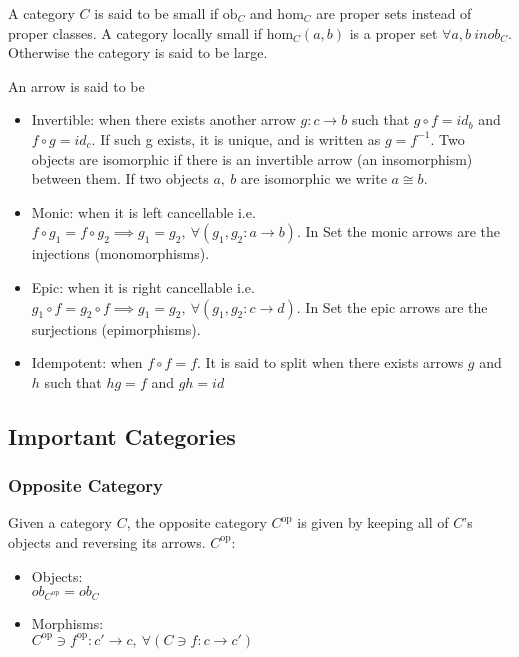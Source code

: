 \noindent A category $C$ is said to be small if $\mathrm{ob}_C$ and
$\mathrm{hom}_C$ are proper sets instead of proper classes. A category locally
small if $\mathrm{hom}_C(a, b)$ is a proper set $\forall a, b\ in ob_C$.
Otherwise the category is said to be large. \cite{nlab:category}
\medskip

\noindent\cite{categories_working_mathematician} An arrow is said to be
\begin{itemize}
  \item Invertible: when there exists another arrow $g:c \to b$ such that
    $g\circ f = id_b$ and $f\circ g = id_c$. If such g exists, it is unique, and
    is written as $g= f^{-1}$. Two objects are isomorphic if there is an
    invertible arrow (an insomorphism) between them. If two objects $a,\ b$
    are isomorphic we write $a\cong b$.
  \item Monic: when it is left cancellable i.e.
    $f \circ g_1 = f \circ g_2 \implies g_1 = g_2,\ \forall (g_1, g_2:a\to b)$.
    In Set the monic arrows are the injections (monomorphisms).
  \item Epic: when it is right cancellable i.e.
    $g_1 \circ f = g_2 \circ f \implies g_1 = g_2,\ \forall (g_1, g_2: c\to d)$.
    In Set the epic arrows are the surjections (epimorphisms).
  \item Idempotent: when $f\circ f = f$. It is said to split when there exists
    arrows $g$ and $h$ such that $hg = f$ and $gh = id$
\end{itemize}

\subsection{Important Categories}

\subsubsection{Opposite Category}
Given a category $C$, the opposite category $C^\mathrm{op}$ is given by keeping
all of $C$'s objects and reversing its arrows. \cite{nlab:opposite_category}
$C^\mathrm{op}$:
\begin{itemize}
  \item Objects:\\
    $ob_{C^\mathrm{op}} = ob_C$
  \item Morphisms:\\
    $C^{\mathrm{op}} \ni f^{\mathrm{op}} : c' \to c,
      \ \forall (C \ni f : c \to c')$
\end{itemize}

